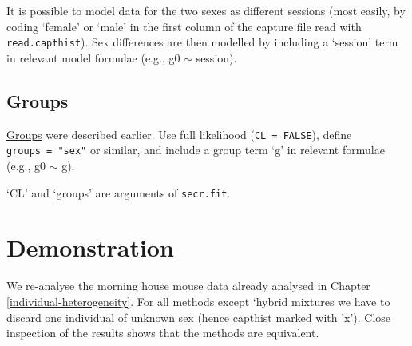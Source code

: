 \documentclass[
]{book}
\newenvironment{Shaded}{\begin{snugshade}}{\end{snugshade}}
\newcommand{\AttributeTok}[1]{\textcolor[rgb]{0.13,0.29,0.53}{#1}}
\newcommand{\CommentTok}[1]{\textcolor[rgb]{0.56,0.35,0.01}{\textit{#1}}}
\newcommand{\DecValTok}[1]{\textcolor[rgb]{0.00,0.00,0.81}{#1}}
\newcommand{\FunctionTok}[1]{\textcolor[rgb]{0.13,0.29,0.53}{\textbf{#1}}}
\newcommand{\NormalTok}[1]{#1}
\newcommand{\OtherTok}[1]{\textcolor[rgb]{0.56,0.35,0.01}{#1}}
\newcommand{\SpecialCharTok}[1]{\textcolor[rgb]{0.81,0.36,0.00}{\textbf{#1}}}
\begin{document}
It is possible to model data for the two sexes as different sessions (most easily, by coding `female' or `male' in the first column of the capture file read with \texttt{read.capthist}). Sex differences are then modelled by including a `session' term in relevant model formulae (e.g., g0 \(\sim\) session).

\subsection{Groups}\label{groups-1}

\hyperref[groups]{Groups} were described earlier. Use full likelihood (\texttt{CL\ =\ FALSE}), define \texttt{groups\ =\ "sex"} or similar, and include a group term `g' in relevant formulae (e.g., g0 \(\sim\) g).

`CL' and `groups' are arguments of \texttt{secr.fit}.

\section{Demonstration}\label{demonstration}

We re-analyse the morning house mouse data already analysed in Chapter \ref{individual-heterogeneity}. For all methods except `hybrid mixtures we have to discard one individual of unknown sex (hence capthist marked with 'x'). Close inspection of the results shows that the methods are equivalent.

\begin{Shaded}
\end{Shaded}
\end{document}
